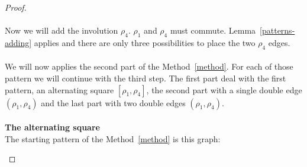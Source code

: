 \begin{proof}
\paragraph{}
Now we will add the involution $\rho_4$. $\rho_1$ and $\rho_4$ must commute. Lemma~\ref{patterns-adding} applies and there are only three possibilities to place the two $\rho_4$ edges.

\paragraph{}
We will now applies the second part of the Method~\ref{method}. For each of those pattern we will continue with the third step. The first part deal with the first pattern, an alternating square $[\rho_1, \rho_4]$, the second part with a single double edge $(\rho_1, \rho_4)$ and the last part with two double edges $(\rho_1, \rho_4)$.

\paragraph{}
\textbf{The alternating square}\\
The starting pattern of the Method~\ref{method} is this graph:

\begin{figure}[H]
  \begin{center}
\end{center}
\end{figure}
\end{proof}
